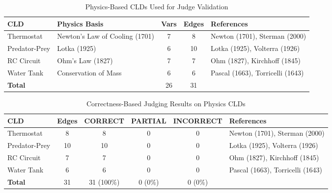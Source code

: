 \begin{table}[htbp]
\centering
\caption{Physics-Based CLDs Used for Judge Validation}
\label{tab:physics-clds-overview}
\begin{tabular}{llccl}
\toprule
\textbf{CLD} & \textbf{Physics Basis} & \textbf{Vars} & \textbf{Edges} & \textbf{References} \\
\midrule
Thermostat & Newton's Law of Cooling (1701) & 7 & 8 & Newton (1701), Sterman (2000) \\
Predator-Prey & Lotka (1925) & 6 & 10 & Lotka (1925), Volterra (1926) \\
RC Circuit & Ohm's Law (1827) & 7 & 7 & Ohm (1827), Kirchhoff (1845) \\
Water Tank & Conservation of Mass & 6 & 6 & Pascal (1663), Torricelli (1643) \\
\midrule
\textbf{Total} & & 26 & 31 & \\
\bottomrule
\end{tabular}
\end{table}


\begin{table}[htbp]
\centering
\caption{Correctness-Based Judging Results on Physics CLDs}
\label{tab:physics-correctness-results}
\begin{tabular}{lccccl}
\toprule
\textbf{CLD} & \textbf{Edges} & \textbf{CORRECT} & \textbf{PARTIAL} & \textbf{INCORRECT} & \textbf{References} \\
\midrule
Thermostat & 8 & 8 & 0 & 0 & Newton (1701), Sterman (2000) \\
Predator-Prey & 10 & 10 & 0 & 0 & Lotka (1925), Volterra (1926) \\
RC Circuit & 7 & 7 & 0 & 0 & Ohm (1827), Kirchhoff (1845) \\
Water Tank & 6 & 6 & 0 & 0 & Pascal (1663), Torricelli (1643) \\
\midrule
\textbf{Total} & 31 & 31 (100\%) & 0 (0\%) & 0 (0\%) & \\
\bottomrule
\end{tabular}
\end{table}


